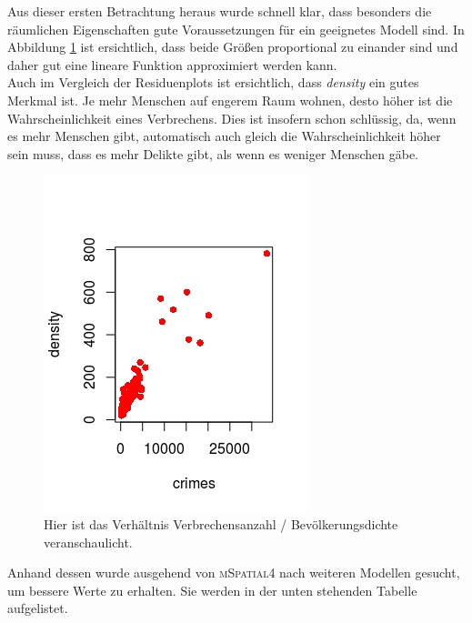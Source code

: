 \par\smallskip
Aus dieser ersten Betrachtung heraus wurde schnell klar, dass besonders die r\"aumlichen Eigenschaften gute Voraussetzungen f\"ur ein geeignetes Modell sind.
In Abbildung \ref{fig:dcc} ist ersichtlich, dass beide Gr\"o\ss{}en proportional zu einander sind und daher gut eine lineare Funktion approximiert werden kann. \\
Auch im Vergleich der Residuenplots ist ersichtlich, dass \textit{density} ein gutes Merkmal ist.
Je mehr Menschen auf engerem Raum wohnen, desto h\"oher ist die Wahrscheinlichkeit eines Verbrechens.
Dies ist insofern schon schl\"ussig, da, wenn es mehr Menschen gibt, automatisch auch gleich die Wahrscheinlichkeit h\"oher sein muss, dass es mehr Delikte gibt, als wenn es weniger Menschen g\"abe.

\begin{figure}
\centering
\includegraphics[scale=0.7]{./jpgs/dcc.jpeg}
\caption[Verh\"altnis Verbrechensanzahl / Bev\"olkerungsdichte]{Hier ist das Verh\"altnis Verbrechensanzahl / Bev\"olkerungsdichte veranschaulicht.}
\label{fig:dcc}
\end{figure}

Anhand dessen wurde ausgehend von \textsc{mSpatial4} nach weiteren Modellen gesucht, um bessere Werte zu erhalten.
Sie werden in der unten stehenden Tabelle aufgelistet.

